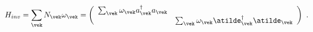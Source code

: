 \begin{equation}
 H_{inv} = \sum_{\vek}N_{\vek}\omega_{\vek}
 \mbox{} = \left( \begin{array}{cc}
 \sum_{\vek} \omega_{\vek} a^\dagger_{\vek}a_{\vek} & \mbox{} \\
 \mbox{} & \sum_{\vek} \omega_{\vek}\atilde^\dagger_{\vek}
 \atilde_{\vek}  \end{array} \right) \ .
\label{enop}
 \end{equation}

